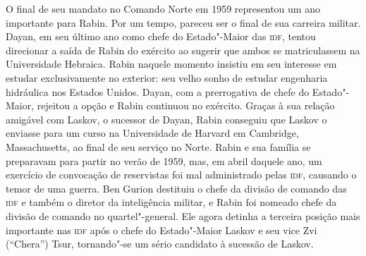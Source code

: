 O final de seu mandato no Comando Norte em 1959 representou um ano
importante para Rabin. Por um tempo, pareceu ser o final de sua carreira
militar. Dayan, em seu último ano como chefe do Estado"-Maior das \textsc{idf},
tentou direcionar a saída de Rabin do exército ao sugerir que
ambos se matriculassem na Universidade Hebraica. Rabin
naquele momento insistiu em seu interesse em estudar exclusivamente no
exterior: seu velho sonho de estudar engenharia hidráulica nos Estados Unidos.
Dayan, com a prerrogativa de chefe do Estado"-Maior, rejeitou a opção e
Rabin continuou no exército. Graças à sua relação amigável com Laskov, o
sucessor de Dayan, Rabin conseguiu que Laskov o enviasse para um curso
na Universidade de Harvard em Cambridge, Massachusetts, ao final de seu
serviço no Norte. Rabin e sua família se preparavam para partir no verão
de 1959, mas, em abril daquele ano, um exercício de convocação de
reservistas foi mal administrado pelas \textsc{idf}, causando o temor de uma
guerra. Ben Gurion destituiu o chefe da divisão de comando das \textsc{idf} e também o
diretor da inteligência militar, e Rabin foi nomeado chefe da divisão de
comando no quartel"-general. Ele agora detinha a terceira posição mais
importante nas \textsc{idf} após o chefe do Estado"-Maior Laskov e seu vice Zvi
(``Chera'') Tsur, tornando"-se um sério candidato à sucessão de Laskov.

